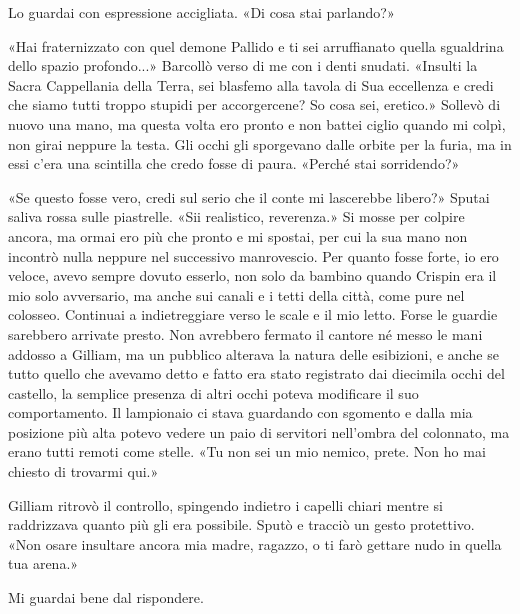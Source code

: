 Lo guardai con espressione accigliata. «Di cosa stai parlando?»

«Hai fraternizzato con quel demone Pallido e ti sei arruffianato quella
sgualdrina dello spazio profondo...» Barcollò verso di me con i denti
snudati. «Insulti la Sacra Cappellania della Terra, sei blasfemo alla
tavola di Sua eccellenza e credi che siamo tutti troppo stupidi per
accorgercene? So cosa sei, eretico.» Sollevò di nuovo una mano, ma
questa volta ero pronto e non battei ciglio quando mi colpì, non girai
neppure la testa. Gli occhi gli sporgevano dalle orbite per la furia, ma
in essi c'era una scintilla che credo fosse di paura. «Perché stai
sorridendo?»

«Se questo fosse vero, credi sul serio che il conte mi lascerebbe
libero?» Sputai saliva rossa sulle piastrelle. «Sii realistico,
reverenza.» Si mosse per colpire ancora, ma ormai ero più che pronto e
mi spostai, per cui la sua mano non incontrò nulla neppure nel
successivo manrovescio. Per quanto fosse forte, io ero veloce, avevo
sempre dovuto esserlo, non solo da bambino quando Crispin era il mio
solo avversario, ma anche sui canali e i tetti della città, come pure
nel colosseo. Continuai a indietreggiare verso le scale e il mio letto.
Forse le guardie sarebbero arrivate presto. Non avrebbero fermato il
cantore né messo le mani addosso a Gilliam, ma un pubblico alterava la
natura delle esibizioni, e anche se tutto quello che avevamo detto e
fatto era stato registrato dai diecimila occhi del castello, la semplice
presenza di altri occhi poteva modificare il suo comportamento. Il
lampionaio ci stava guardando con sgomento e dalla mia posizione più
alta potevo vedere un paio di servitori nell'ombra del colonnato, ma
erano tutti remoti come stelle. «Tu non sei un mio nemico, prete. Non ho
mai chiesto di trovarmi qui.»

Gilliam ritrovò il controllo, spingendo indietro i capelli chiari mentre
si raddrizzava quanto più gli era possibile. Sputò e tracciò un gesto
protettivo. «Non osare insultare ancora mia madre, ragazzo, o ti farò
gettare nudo in quella tua arena.»

Mi guardai bene dal rispondere.

